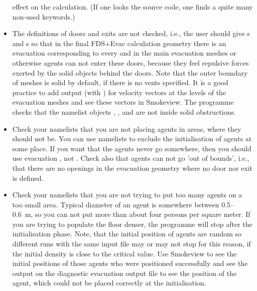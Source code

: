\documentclass[12pt,a4paper,final,twoside]{stylevk}
\begin{document}
\begin{itemize}
  effect on the calculation.  (If one looks the 
  source code, one finds a quite many non-used keywords.)
%
\item The definitions of doors and exits are not checked, i.e.,
  the user should give s and s so that in the
  final FDS+Evac calculation geometry there is an evacuation
   corresponding to every  and  in
  the main evacuation meshes or otherwise agents can not enter these
  doors, because they feel repulsive forces exerted by the solid
  objects behind the doors.  Note that the outer boundary of meshes is
  solid by default, if there is no vents specified.  It is a good
  practice to add  output (with )
  for velocity vectors at the levels of the evacuation meshes and see
  these vectors in Smokeview.  The programme checks that the namelist
  objects , , and  are not inside
  solid obstructions.
%
\item Check your  namelists that you are not placing
  agents in areas, where they should not be.  You can use 
  namelists to exclude the initialisation of agents at some place.  If
  you want that the agents never go somewhere, then you should use
  evacuation , not .  Check also that agents
  can not go 'out of bounds', i.e., that there are no openings
  in the evacuation geometry where no door nor exit is defined.
%
\item Check your  namelists that you are not trying to put
  too many agents on a too small area.  Typical diameter of an agent
  is somewhere between 0.5--0.6~m, so you can not put more than about
  four persons per square meter.  If you are trying to populate the
  floor denser, the programme will stop after the initialisation
  phase.  Note, that the initial position of agents are random so
  different runs with the same input file may or may not stop for this
  reason, if the initial density is close to the critical value.  Use
  Smokeview to see the initial positions of those agents who were
  positioned successfully and see the output on the diagnostic
  evacuation output file  to see the position of
  the agent, which could not be placed correctly at the
  initialisation.
%
\end{itemize}
\end{document}
